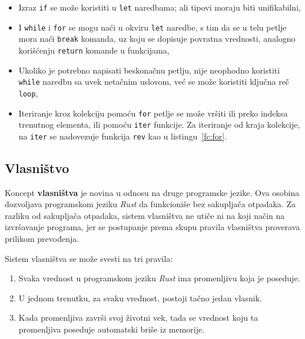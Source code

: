 \documentclass[12pt,oneside]{memoir}
\begin{document}
\begin{itemize}
  \item Izraz \texttt{if} se može koristiti u \texttt{let} naredbama; ali
        tipovi moraju biti unifikabilni,
  \item I \texttt{while} i \texttt{for} se mogu naći u okviru \texttt{let}
        naredbe, s tim da se u telu petlje mora naći \texttt{break} komanda,
        uz koju se dopisuje povratna vrednosti, analogno korišćenju \texttt{return}
        komande u funkcijama,
  \item Ukoliko je potrebno napisati beskonačnu petlju, nije neophodno koristiti
        \texttt{while} naredbu sa uvek netačnim uslovom, već se može koristiti
        ključna reč \texttt{loop},
  \item Iteriranje kroz kolekciju pomoću \texttt{for} petlje se može vršiti ili
        preko indeksa trenutnog elementa, ili pomoću \texttt{iter} funkcije.
        Za iteriranje od kraja kolekcije, na \texttt{iter} se nadovezuje
        funkcija \texttt{rev} kao u listingu~\ref{fc:for}.
\end{itemize}



\subsection{Vlasništvo}
Koncept \textbf{vlasništva} je novina u odnosu na druge programske jezike. Ova
osobina dozvoljava programskom jeziku \emph{Rust} da funkcioniše bez sakupljača
otpadaka. Za razliku od sakupljača otpadaka, sistem vlasništva ne utiče ni na
koji način na izvršavanje programa, jer se postupanje prema skupu pravila
vlasništva proverava prilikom prevođenja.

Sistem vlasništva se može svesti na tri pravila:

\begin{enumerate}
  \item Svaka vrednost u programskom jeziku \emph{Rust} ima promenljivu koja
        je poseduje.
  \item U jednom trenutku, za svaku vrednost, postoji tačno jedan vlasnik.
  \item Kada promenljiva završi svoj životni vek, tada se vrednost
        koju ta promenljiva poseduje automatski briše iz memorije.
\end{enumerate}
\end{document}

